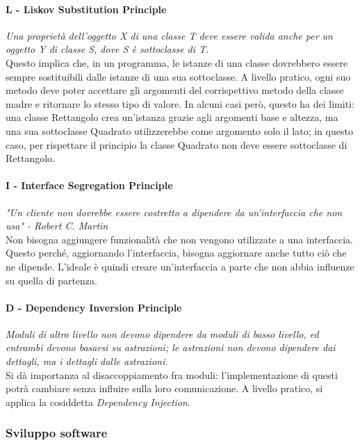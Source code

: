 \documentclass{article}
\begin{document}
            \paragraph{L - Liskov Substitution Principle} \textit{Una proprietà dell'oggetto X di una classe T deve essere valida anche per un oggetto Y di classe S, dove S è sottoclasse di T.}\\
            Questo implica che, in un programma, le istanze di una classe dovrebbero essere sempre sostituibili dalle istanze di una sua sottoclasse. A livello pratico, ogni suo metodo deve poter accettare gli argomenti del corrispettivo metodo della classe madre e ritornare lo stesso tipo di valore. In alcuni casi però, questo ha dei limiti: una classe Rettangolo crea un'istanza grazie agli argomenti base e altezza, ma una sua sottoclasse Quadrato utilizzerebbe come argomento solo il lato; in questo caso, per rispettare il principio la classe Quadrato non deve essere sottoclasse di Rettangolo.
            \paragraph{I - Interface Segregation Principle} \textit{"Un cliente non dovrebbe essere costretto a dipendere da un'interfaccia che non usa" - Robert C. Martin}\\
            Non bisogna aggiungere funzionalità che non vengono utilizzate a una interfaccia. Questo perché, aggiornando l'interfaccia, bisogna aggiornare anche tutto ciò che ne dipende. L'ideale è quindi creare un'interfaccia a parte che non abbia influenze su quella di partenza.
            \paragraph{D - Dependency Inversion Principle} \textit{Moduli di altro livello non devono dipendere da moduli di basso livello, ed entrambi devono basarsi su astrazioni; le astrazioni non devono dipendere dai dettagli, ma i dettagli dalle astrazioni.}\\
            Si dà importanza al disaccoppiamento fra moduli: l'implementazione di questi potrà cambiare senza influire sulla loro comunicazione. A livello pratico, si applica la cosiddetta \textit{Dependency Injection}.
        \subsubsection{Sviluppo software}
\end{document}

